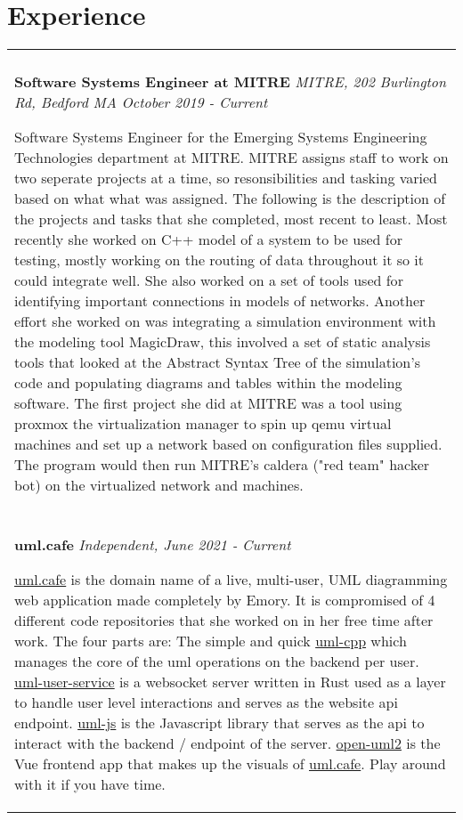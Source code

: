 \documentclass[11pt]{article}
\begin{document}
\section*{Experience}
\begin{tabular}{p{18.5cm}}
    \hline
    \multicolumn{1}{c}{} \\

    \large \textbf{Software Systems Engineer at MITRE} \normalsize \textit{MITRE, 202 Burlington Rd, Bedford MA \hfill October 2019 - Current}

    \> Software Systems Engineer for the Emerging Systems Engineering Technologies department at MITRE. MITRE assigns staff to work 
    on two seperate projects at a time, so resonsibilities and tasking varied based on what what was assigned. The following is the 
    description of the projects and tasks that she completed, most recent to least. Most recently she worked on C++ model of a system
    to be used for testing, mostly working on the routing of data throughout it so it could integrate well. She also worked on a set
    of tools used for identifying important connections in models of networks. Another effort she worked on was integrating a 
    simulation environment with the modeling tool MagicDraw, this involved a set of static analysis tools that looked at the 
    Abstract Syntax Tree of the simulation's code and populating diagrams and tables within the modeling software. The first project
    she did at MITRE was a tool using proxmox the virtualization manager to spin up qemu virtual machines and set up a network based 
    on configuration files supplied. The program would then run MITRE's caldera ("red team" hacker bot) on the virtualized network and
    machines.\\

    \multicolumn{1}{c}{} \\

    \large \textbf{uml.cafe} \normalsize \textit{Independent, June 2021 - Current}

    \> \href{https://uml.cafe}{uml.cafe} is the domain name of a live, multi-user, UML diagramming web application made completely 
    by Emory. It is compromised of 4 different code repositories that she worked on in her free time after work. The four parts are: 
    The simple and quick \href{https://github.com/nemears/uml-cpp}{uml-cpp} which manages the core of the uml operations on the backend
    per user. \href{https://github.com/nemears/uml-user-service}{uml-user-service} is a websocket server written in Rust used as a layer to
    handle user level interactions and serves as the website api endpoint. \href{https://github.com/nemears/uml-js}{uml-js} is the 
    Javascript library that serves as the api to interact with the backend / endpoint of the server. \href{https://github.com/open-uml2}{open-uml2}
    is the Vue frontend app that makes up the visuals of \href{https://uml.cafe}{uml.cafe}. Play around with it if you have time.\\


\end{tabular}
\end{document}
